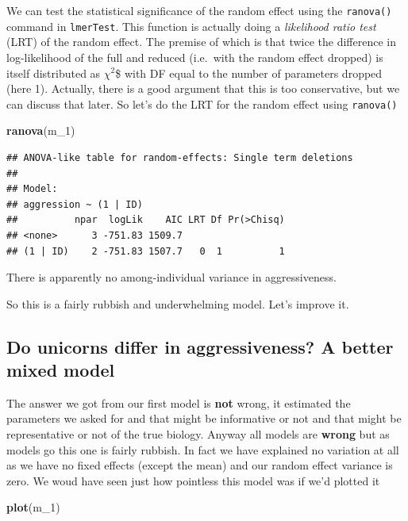 \documentclass[
  12pt,
]{book}
\newenvironment{Shaded}{\begin{snugshade}}{\end{snugshade}}
\newcommand{\DecValTok}[1]{\textcolor[rgb]{0.00,0.00,0.81}{#1}}
\newcommand{\KeywordTok}[1]{\textcolor[rgb]{0.13,0.29,0.53}{\textbf{#1}}}
\newcommand{\NormalTok}[1]{#1}
\begin{document}
We can test the statistical significance of the random effect using the \texttt{ranova()} command in \texttt{lmerTest}. This function is actually doing a \emph{likelihood ratio test} (LRT) of the random effect. The premise of which is that twice the difference in log-likelihood of the full and reduced (i.e.~with the random effect dropped) is itself distributed as \(\chi^2\)\$ with DF equal to the number of parameters dropped (here 1). Actually, there is a good argument that this is too conservative, but we can discuss that later. So let's do the LRT for the random effect using \texttt{ranova()}

\begin{Shaded}
\begin{Highlighting}[]
\KeywordTok{ranova}\NormalTok{(m\_}\DecValTok{1}\NormalTok{)}
\end{Highlighting}
\end{Shaded}

\begin{verbatim}
## ANOVA-like table for random-effects: Single term deletions
## 
## Model:
## aggression ~ (1 | ID)
##          npar  logLik    AIC LRT Df Pr(>Chisq)
## <none>      3 -751.83 1509.7                  
## (1 | ID)    2 -751.83 1507.7   0  1          1
\end{verbatim}

There is apparently no among-individual variance in aggressiveness.

So this is a fairly rubbish and underwhelming model. Let's improve it.

\hypertarget{do-unicorns-differ-in-aggressiveness-a-better-mixed-model}{%
\subsection{Do unicorns differ in aggressiveness? A better mixed model}\label{do-unicorns-differ-in-aggressiveness-a-better-mixed-model}}

The answer we got from our first model is \textbf{not} wrong, it estimated the parameters we asked for and that might be informative or not and that might be representative or not of the true biology. Anyway all models are \textbf{wrong} but as models go this one is fairly rubbish. In fact we have explained no variation at all as we have no fixed effects (except the mean) and our random effect variance is zero. We woud have seen just how pointless this model was if we'd plotted it

\begin{Shaded}
\begin{Highlighting}[]
\KeywordTok{plot}\NormalTok{(m\_}\DecValTok{1}\NormalTok{)}
\end{Highlighting}
\end{Shaded}
\end{document}
